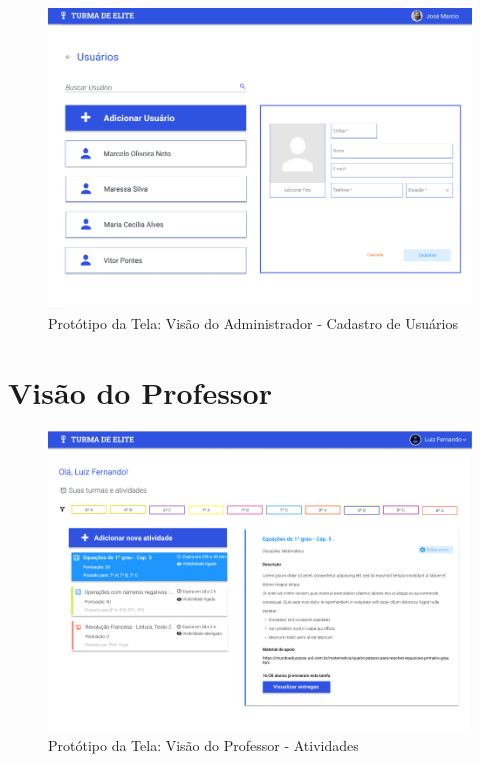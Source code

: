 \documentclass[
    12pt,               %
    openright,          %
    oneside,
    a4paper,            %
    english,            %
    brazil              %
    ]{ifsp-spo-inf-ctds} %
\begin{document}
\begin{apendicesenv}
\begin{figure}[htb]
    \centering
	\includegraphics[width=16cm]{imagens/Administrador-CadastroUsuario.png}
	\caption{\label{fig:cadastro-usuário} Protótipo da Tela: Visão do Administrador - Cadastro de Usuários}
\end{figure}
\FloatBarrier


\section{Visão do Professor}

\begin{figure}[htb]
    \centering
	\includegraphics[width=16cm]{imagens/Professor-Atividades.png}
	\caption{\label{fig:atividades} Protótipo da Tela: Visão do Professor - Atividades}
\end{figure}
\FloatBarrier


\end{apendicesenv}
\end{document}
